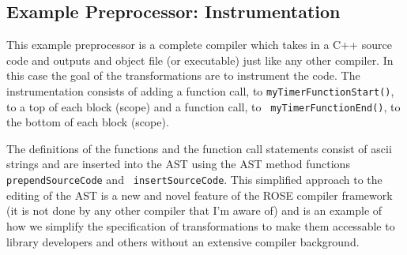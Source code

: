 \documentclass[10pt]{article}
\newcommand{\commentout}[1]{}
\begin{document}
\subsection{Example Preprocessor: Instrumentation}

   This example preprocessor is a complete compiler which takes in a C++ source code and outputs and
object file (or executable) just like any other compiler.  In this case the goal of the
transformations are to instrument the code.  The instrumentation consists of adding a function call,
to {\tt myTimerFunctionStart()}, to a top of each block (scope) and a function call, to {\tt
myTimerFunctionEnd()}, to the bottom of each block (scope).  

\commentout{
Inorder to be compleatly
self-contained, and additional transformation inserts the definitions of {\tt
myTimerFunctionStart()} and {\tt myTimerFunctionEnd()} at the top fo the program (just before the
{\tt main()} function).
}

   The definitions of the functions and the function call statements consist of ascii strings and
are inserted into the AST using the AST method functions {\tt prependSourceCode} and {\tt
insertSourceCode}.  This simplified approach to the editing of the AST is a new and novel feature of
the ROSE compiler framework (it is not done by any other compiler that I'm aware of) and is an
example of how we simplify the specification of transformations to make them accessable to library
developers and others without an extensive compiler background.

\vspace{0.5in}
\end{document}
